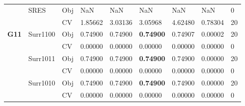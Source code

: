 \begin{table*}[!htb]
\begin{tabular}{lllllllll}
		& \multirow{2}{*}{SRES}              & Obj                                & NaN                                & NaN                                & NaN                                  & NaN                                 & NaN                               & 0                \\
		&                                    & CV                                 & 1.85662                            & 3.03136                            & 3.05968                              & 4.62480                             & 0.78304                           & 20               \\ \hline
		\multirow{16}{*}{\textbf{G11}}               & \multirow{2}{*}{Surr1100}          & Obj                                & 0.74900                            & 0.74900                            & \textbf{0.74900}                     & 0.74907                             & 0.00002                           & 20               \\
		&                                    & CV                                 & 0.00000                            & 0.00000                            & 0.00000                              & 0.00000                             & 0.00000                           & 0                \\
		& \multirow{2}{*}{Surr1011}          & Obj                                & 0.74900                            & 0.74900                            & \textbf{0.74900}                     & 0.74900                             & 0.00000                           & 20               \\
		&                                    & CV                                 & 0.00000                            & 0.00000                            & 0.00000                              & 0.00000                             & 0.00000                           & 0                \\
		& \multirow{2}{*}{Surr1010}          & Obj                                & 0.74900                            & 0.74900                            & \textbf{0.74900}                     & 0.74900                             & 0.00000                           & 20               \\
		&                                    & CV                                 & 0.00000                            & 0.00000                            & 0.00000                              & 0.00000                             & 0.00000                           & 0                \\

\end{tabular}
\end{table*}
